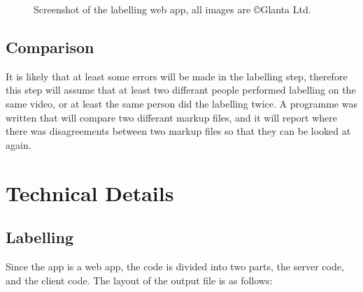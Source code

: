     \begin{figure}[h]
        \centering
        \caption{Screenshot of the labelling web app, all images are \copyright \space Glanta Ltd.}
        \label{fig:markupscreenshot}
    \end{figure}

    \subsection{Comparison} 
    It is likely that at least some errors will be made in the labelling step, therefore this step will assume that at least two differant people performed labelling on the same video, or at least the same person did the labelling twice. A programme was written that will compare two differant markup files, and it will report where there was disagreements between two markup files so that they can be looked at again.

\section{Technical Details}
    \subsection{Labelling}
    Since the app is a web app, the code is divided into two parts, the server code, and the client code. The layout of the output file is as follows:

